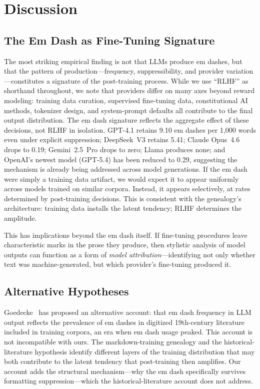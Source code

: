 \section{Discussion}
\label{sec:discussion}

\subsection{The Em Dash as Fine-Tuning Signature}

The most striking empirical finding is not that LLMs produce em dashes, but that the pattern of production---frequency, suppressibility, and provider variation---constitutes a signature of the post-training process. While we use ``RLHF'' as shorthand throughout, we note that providers differ on many axes beyond reward modeling: training data curation, supervised fine-tuning data, constitutional AI methods, tokenizer design, and system-prompt defaults all contribute to the final output distribution. The em dash signature reflects the aggregate effect of these decisions, not RLHF in isolation. GPT-4.1 retains 9.10 em dashes per 1,000 words even under explicit suppression; DeepSeek~V3 retains 5.41; Claude Opus~4.6 drops to 0.19; Gemini~2.5~Pro drops to zero; Llama produces none; and OpenAI's newest model (GPT-5.4) has been reduced to 0.29, suggesting the mechanism is already being addressed across model generations. If the em dash were simply a training data artifact, we would expect it to appear uniformly across models trained on similar corpora. Instead, it appears selectively, at rates determined by post-training decisions. This is consistent with the genealogy's architecture: training data installs the latent tendency; RLHF determines the amplitude.

This has implications beyond the em dash itself. If fine-tuning procedures leave characteristic marks in the prose they produce, then stylistic analysis of model outputs can function as a form of \textit{model attribution}---identifying not only whether text was machine-generated, but which provider's fine-tuning produced it.

\subsection{Alternative Hypotheses}

Goedecke~\cite{goedecke2025emdash} has proposed an alternative account: that em dash frequency in LLM output reflects the prevalence of em dashes in digitized 19th-century literature included in training corpora, an era when em dash usage peaked. This account is not incompatible with ours. The markdown-training genealogy and the historical-literature hypothesis identify different layers of the training distribution that may both contribute to the latent tendency that post-training then amplifies. Our account adds the structural mechanism---why the em dash specifically survives formatting suppression---which the historical-literature account does not address.

